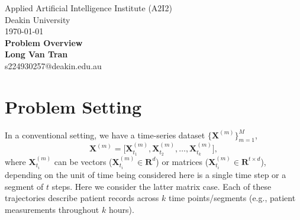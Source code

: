 \documentclass[a4paper, 11pt]{article}
\begin{document}
\begin{sloppypar}
\begin{center}
Applied Artificial Intelligence Institute (A2I2)\\
Deakin University\\
\today\\[24pt]
\LARGE
\textbf{Problem Overview}\\[6pt]
\small
\textbf {Long Van Tran}\\[6pt]
s224930257@deakin.edu.au\\[6pt]
\end{center}





\section{Problem Setting}\label{s:1}
In a conventional setting, we have a time-series dataset $\{\mathbf{X}^{(m)}\}_{m=1}^M$,
\[
\mathbf{X}^{(m)} 
= 
\bigl[\mathbf{X}_{t_{1}}^{(m)}, \mathbf{X}_{t_{2}}^{(m)}, \ldots, \mathbf{X}_{t_{k}}^{(m)}\bigr],
\]
where $\mathbf{X}_{t_{i}}^{(m)}$ can be vectors ($\mathbf{X}_{t_{i}}^{(m)} \in \mathbf{R}^d$) or matrices
($\mathbf{X}_{t_{i}}^{(m)} \in \mathbf{R}^{t \times d}$), depending on the unit of time being considered
here is a single time step or a segment of $t$ steps. Here we consider the latter matrix case.
Each of these trajectories describe patient records across \(k\) time points/segments
(e.g., patient measurements throughout \(k\) hours).


\end{sloppypar}
\end{document}
